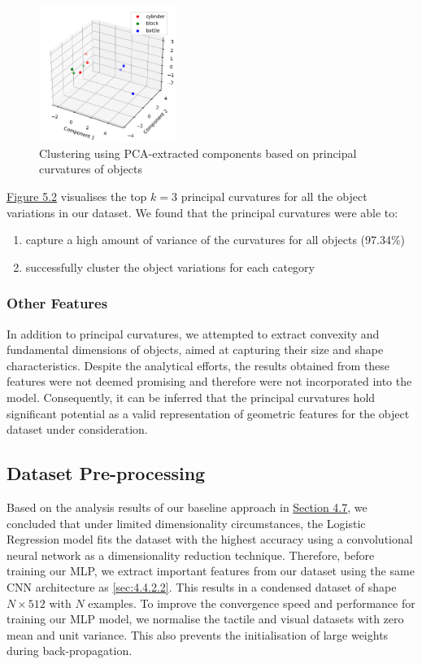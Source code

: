 \documentclass[11pt, a4paper]{report}
\begin{document}
\begin{figure}[H]
    \centering
    \includegraphics[width=0.4\textwidth]{docs/Project Report/Media/5_2_3_principal_curvature_3d.png}
    \caption{Clustering using PCA-extracted components based on principal curvatures of objects}
    \label{fig:5.2}
\end{figure}

\hyperref[fig:5.2]{Figure 5.2} visualises the top $k=3$ principal curvatures for all the object variations in our dataset. We found that the principal curvatures were able to:
\begin{enumerate}[\itemsep=0em]
    \item capture a high amount of variance of the curvatures for all objects (97.34\%)
    \item successfully cluster the object variations for each category
\end{enumerate}


\subsubsection{Other Features}\label{sec:5.2.3.2}
In addition to principal curvatures, we attempted to extract convexity and fundamental dimensions of objects, aimed at capturing their size and shape characteristics. Despite the analytical efforts, the results obtained from these features were not deemed promising and therefore were not incorporated into the model. Consequently, it can be inferred that the principal curvatures hold significant potential as a valid representation of geometric features for the object dataset under consideration.


\subsection{Dataset Pre-processing}\label{sec:5.2.4}
Based on the analysis results of our baseline approach in \hyperref[sec:4.7]{Section 4.7}, we concluded that under limited dimensionality circumstances, the Logistic Regression model fits the dataset with the highest accuracy using a convolutional neural network as a dimensionality reduction technique. Therefore, before training our MLP, we extract important features from our dataset using the same CNN architecture as \ref{sec:4.4.2.2}. This results in a condensed dataset of shape $N\times512$ with $N$ examples. To improve the convergence speed and performance for training our MLP model, we normalise the tactile and visual datasets with zero mean and unit variance. This also prevents the initialisation of large weights during back-propagation.
\end{document}

